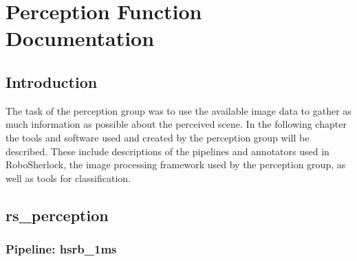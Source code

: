 \documentclass[main.tex]{subfiles}
\begin{document}
\begingroup

\renewcommand{\cleardoublepage}{}

\renewcommand{\clearpage}{}
\newpage
\chapter{Perception Function Documentation}

\section{Introduction}
The task of the perception group was to use the available image data to gather as much information as possible about the perceived scene. In the following chapter the tools and software used and created by the perception group will be described. These include descriptions of the pipelines and annotators used in RoboSherlock, the image processing framework used by the perception group, as well as tools for classification.

		\section{rs\_perception}
			\subsection{Pipeline: hsrb\_1ms}
\end{document}

